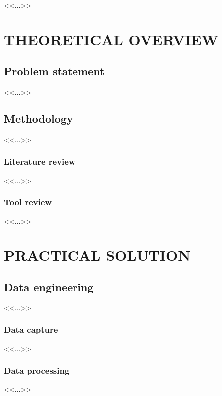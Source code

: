 \documentclass[a4paper,12pt]{extarticle}
\begin{document}
    
    \pagebreak

    
    \pagebreak

    \tableofcontents{}
    \pagebreak

    <<...>>

    \newpage
    \section{THEORETICAL OVERVIEW}
    \subsection{Problem statement}
    <<...>>

    \subsection{Methodology}
    <<...>>

    \subsubsection{Literature review}
    <<...>>

    \subsubsection{Tool review}
    <<...>>

    \newpage
    \section{PRACTICAL SOLUTION}
    \subsection{Data engineering}
    <<...>>

    \subsubsection{Data capture}
    <<...>>

    \subsubsection{Data processing}
    <<...>>
\end{document}
